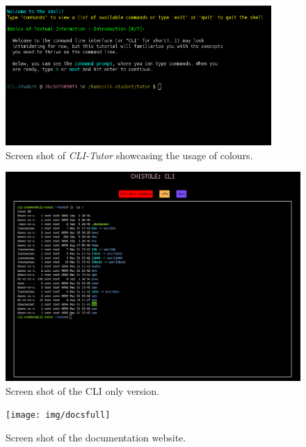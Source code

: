 \begin{figure}[htbp]
	\centering
	\includegraphics[width=0.9\textwidth]{img/lesson1.1}
	\caption{Screen shot of \textit{CLI-Tutor} showcasing the usage of colours.}
	\label{fig:colours}
\end{figure}

\begin{figure}[htbp]
	\centering
	\includegraphics[width=1\textwidth]{img/clionly}
	\caption{Screen shot of the CLI only version.}
	\label{fig:cliversion}
\end{figure}

\begin{figure}[htbp]
	\centering
	\texttt{[image: img/docsfull]}
	\caption{Screen shot of the documentation website.}
	\label{fig:docsweb}
\end{figure}

